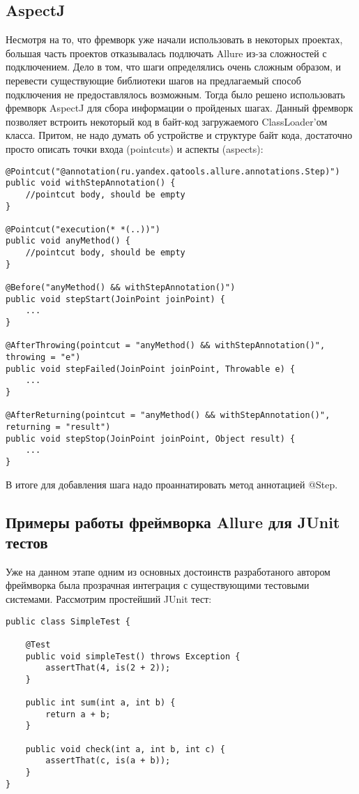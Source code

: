 \subsection{AspectJ}

Несмотря на то, что фремворк уже начали использовать в некоторых проектах, большая часть проектов отказывалась подлючать Allure из-за сложностей с подключением. Дело в том, что шаги определялись очень сложным образом, и перевести существующие библиотеки шагов на предлагаемый способ подключения не предоставлялось возможным. Тогда было решено использовать фремворк AspectJ для сбора информации о пройденых шагах. Данный фремворк позволяет встроить некоторый код в байт-код загружаемого ClassLoader'ом класса. Притом, не надо думать об устройстве и структуре байт кода, достаточно просто описать  точки входа (pointcuts) и аспекты (aspects): 

\begin{lstlisting}
@Pointcut("@annotation(ru.yandex.qatools.allure.annotations.Step)")
public void withStepAnnotation() {
    //pointcut body, should be empty
}

@Pointcut("execution(* *(..))")
public void anyMethod() {
    //pointcut body, should be empty
}

@Before("anyMethod() && withStepAnnotation()")
public void stepStart(JoinPoint joinPoint) {
    ...
}

@AfterThrowing(pointcut = "anyMethod() && withStepAnnotation()", throwing = "e")
public void stepFailed(JoinPoint joinPoint, Throwable e) {
    ...
}

@AfterReturning(pointcut = "anyMethod() && withStepAnnotation()", returning = "result")
public void stepStop(JoinPoint joinPoint, Object result) {
    ...
}
\end{lstlisting}


В итоге для добавления шага надо проаннатировать метод аннотацией @Step. 

\newpage
\subsection{Примеры работы фреймворка Allure для JUnit тестов}

Уже на данном этапе одним из основных достоинств разработаного автором фреймворка была прозрачная интеграция с существующими тестовыми системами. Рассмотрим простейший JUnit тест:
 
\begin{lstlisting}
public class SimpleTest {

    @Test
    public void simpleTest() throws Exception {
        assertThat(4, is(2 + 2));
    }
    
    public int sum(int a, int b) {
		return a + b;
	}    
    
    public void check(int a, int b, int c) {
    	assertThat(c, is(a + b));	
    }
}
\end{lstlisting}


